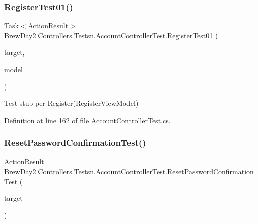 \subsubsection{\texorpdfstring{Register\+Test01()}{RegisterTest01()}}
{\footnotesize\ttfamily Task$<$Action\+Result$>$ Brew\+Day2.\+Controllers.\+Testsn.\+Account\+Controller\+Test.\+Register\+Test01 (\begin{DoxyParamCaption}\item[{\mbox{[}\+Pex\+Assume\+Under\+Test\mbox{]} \mbox{\hyperlink{class_brew_day2_1_1_controllers_1_1_account_controller}{Account\+Controller}}}]{target,  }\item[{\mbox{\hyperlink{class_brew_day2_1_1_models_1_1_register_view_model}{Register\+View\+Model}}}]{model }\end{DoxyParamCaption})}



Test stub per Register(\+Register\+View\+Model)



Definition at line 162 of file Account\+Controller\+Test.\+cs.

\mbox{\label{class_brew_day2_1_1_controllers_1_1_testsn_1_1_account_controller_test_a6ac01fc400a454f7f4038a81fed7ee5c}} 
\subsubsection{\texorpdfstring{Reset\+Password\+Confirmation\+Test()}{ResetPasswordConfirmationTest()}}
{\footnotesize\ttfamily Action\+Result Brew\+Day2.\+Controllers.\+Testsn.\+Account\+Controller\+Test.\+Reset\+Password\+Confirmation\+Test (\begin{DoxyParamCaption}\item[{\mbox{[}\+Pex\+Assume\+Under\+Test\mbox{]} \mbox{\hyperlink{class_brew_day2_1_1_controllers_1_1_account_controller}{Account\+Controller}}}]{target }\end{DoxyParamCaption})}



